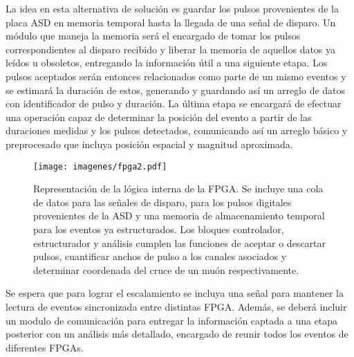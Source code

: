 \par La idea en esta alternativa de solución es guardar los pulsos provenientes de la placa ASD en memoria temporal hasta la llegada de una señal de disparo. Un módulo que maneja la memoria será el encargado de tomar los pulsos correspondientes al disparo recibido y liberar la memoria de aquellos datos ya leídos u obsoletos, entregando la información útil a una siguiente etapa. Los pulsos aceptados serán entonces relacionados como parte de un mismo eventos y se estimará la duración de estos, generando y guardando así un arreglo de datos con identificador de pulso y duración. La última etapa se encargará de efectuar una operación capaz de determinar la posición del evento a partir de las duraciones medidas y los pulsos detectados, comunicando así un arreglo básico y preprocesado que incluya posición espacial y magnitud aproximada.


\begin{figure}[H]
    \centering
    \texttt{[image: imagenes/fpga2.pdf]}
    \caption{Representación de la lógica interna de la FPGA. Se incluye una cola de datos para las señales de disparo, para los pulsos digitales provenientes de la ASD y una memoria de almacenamiento temporal para los eventos ya estructurados. Los bloques controlador, estructurador y análisis cumplen las funciones de aceptar o descartar pulsos, cuantificar anchos de pulso a  los canales asociados y determinar coordenada del cruce de un muón respectivamente.}
    \label{fig:fpga2}
\end{figure}

\par Se espera que para lograr el escalamiento se incluya una señal para mantener la lectura de eventos sincronizada entre distintas FPGA. Además, se deberá incluir un modulo de comunicación para entregar la información captada a una etapa posterior con un análisis más detallado, encargado de reunir todos los eventos de diferentes FPGAs.


\newpage
